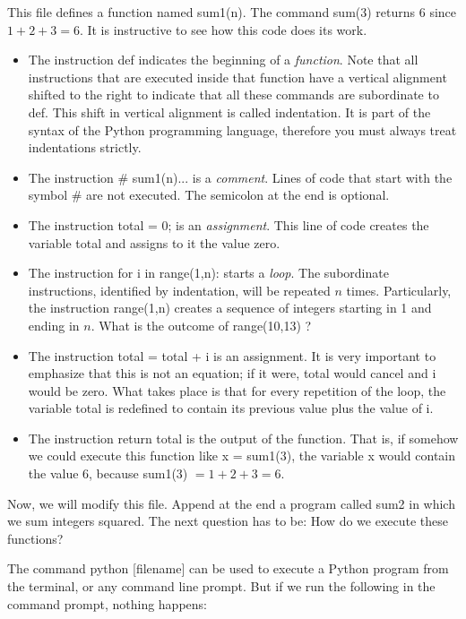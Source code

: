This file defines a function named {\s sum1(n)}. The command {\s sum(3)} returns 6 since
$1 + 2 + 3 = 6$. It is instructive to see how this code does its work.
\begin{itemize}
	\item The instruction {\s def} indicates the beginning of a \textit{function}. Note that all instructions that are executed inside that function have a vertical alignment shifted to the right to indicate that all these commands are subordinate to {\s def}. This shift in vertical alignment is called indentation. It is part of the syntax of the Python programming language, therefore you must always treat indentations strictly. 
	\item The instruction {\s \# sum1(n)...} is a \textit{comment}. Lines of code that start with the symbol {\s \#} are not executed. The semicolon at the end is optional. 
	\item The instruction {\s total = 0;} is an \textit{assignment}. This line of code creates the variable {\s total} and assigns to it the value zero. 
	\item The instruction {\s for i in range(1,n):} starts a \textit{loop}. The subordinate instructions, identified by indentation, will be repeated  $n$ times. Particularly, the instruction {\s range(1,n)} creates a sequence of integers starting in 1 and ending in $n$. What is the outcome of {\s range(10,13)} ?
	\item The instruction {\s total = total + i} is an assignment. It is very important to emphasize that this is not an equation; if it were, {\s total} would cancel and  {\s i} would be zero. What takes place is that for every repetition of the loop, the variable {\s total} is redefined to contain its previous value plus the value of {\s i}. 
	\item The instruction {\s return total} is the output of the function. That is, if somehow we could execute this function like {\s x = sum1(3)}, the variable {\s x} would contain the value 6, because {\s sum1(3)} $= 1 + 2  + 3 = 6$.  
\end{itemize}

Now, we will modify this file. Append at the end a program called {\s sum2} in which we sum integers squared.  The next question has to be: How do we execute these functions? 

The command {\s python [filename]} can be used to execute a Python program from the terminal, or any command line prompt. But if we run the following in the command prompt, nothing happens:

